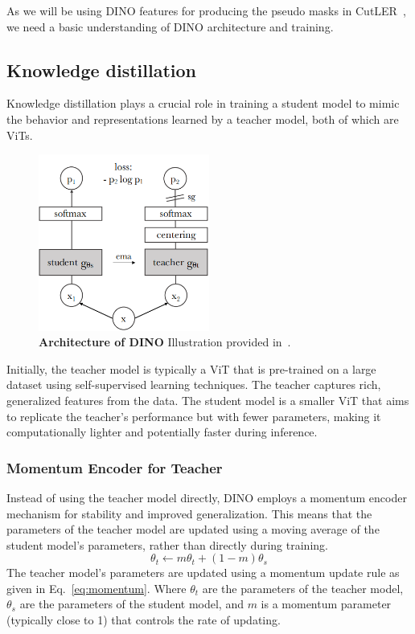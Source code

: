 As we will be using DINO features for producing the pseudo masks in CutLER~\cite{wang2023cut}, we need a basic understanding of DINO architecture and training.

\subsection{Knowledge distillation}
 Knowledge distillation plays a crucial role in training a student model to mimic the behavior and representations learned by a teacher model, both of which are ViTs. 
 
\begin{figure}
	\centering
	\includegraphics[width=0.5\textwidth]{Images/main/dino.png}
	\caption[\textbf{DINO Architecture }]{\textbf{Architecture of DINO} Illustration provided in~\cite{caron2021emerging}.}
	\label{fig:dino}
\end{figure} 
 
 Initially, the teacher model is typically a ViT that is pre-trained on a large dataset using self-supervised learning techniques. The teacher captures rich, generalized features from the data. The student model is a smaller ViT that aims to replicate the teacher's performance but with fewer parameters, making it computationally lighter and potentially faster during inference.
 
\subsubsection{Momentum Encoder for Teacher}
Instead of using the teacher model directly, DINO employs a momentum encoder mechanism for stability and improved generalization. This means that the parameters of the teacher model are updated using a moving average of the student model's parameters, rather than directly during training.
\begin{equation}
	\label{eq:momentum}
	\theta_t \leftarrow m \theta_t + (1 - m) \theta_s
\end{equation}
The teacher model's parameters are updated using a momentum update rule as given in Eq.~\ref{eq:momentum}. Where \(\theta_t\) are the parameters of the teacher model, \(\theta_s\) are the parameters of the student model, and \(m\) is a momentum parameter (typically close to 1) that controls the rate of updating.

